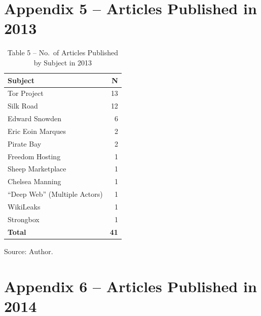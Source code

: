 
\section*{Appendix 5 -- Articles Published in 2013}

\begin{table}[h!]
\centering
\caption*{Table 5 -- No.\ of Articles Published by Subject in 2013}
\begin{tabular}{lr}
\toprule
\textbf{Subject} & \textbf{N} \\
\midrule
Tor Project & 13 \\
Silk Road & 12 \\
Edward Snowden & 6 \\
Eric Eoin Marques & 2 \\
Pirate Bay & 2 \\
Freedom Hosting & 1 \\
Sheep Marketplace & 1 \\
Chelsea Manning & 1 \\
``Deep Web'' (Multiple Actors) & 1 \\
WikiLeaks & 1 \\
Strongbox & 1 \\
\midrule
\textbf{Total} & \textbf{41} \\
\bottomrule
\end{tabular}

\vspace{0.5em}
\noindent Source: Author.
\end{table}

\newpage

\section*{Appendix 6 -- Articles Published in 2014}

